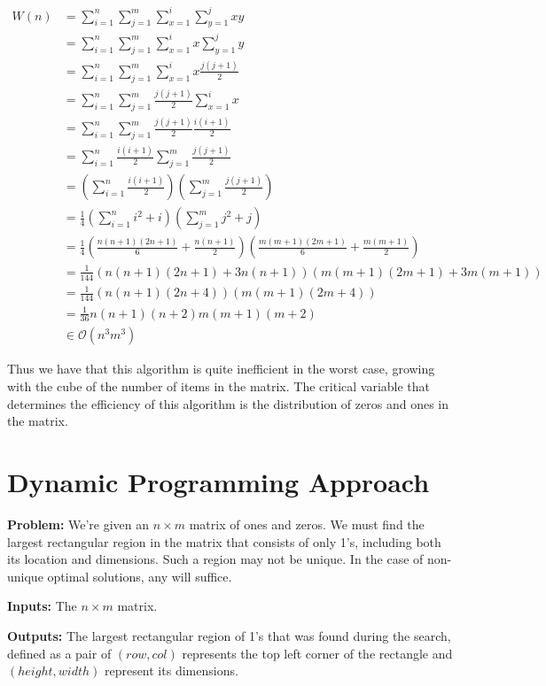 \documentclass{article}
\begin{document}
\begin{align}
W(n) &= \sum_{i=1}^n {\sum_{j=1}^m {\sum_{x=1}^i{\sum_{y=1}^j{xy}}}} \\
&= \sum_{i=1}^n {\sum_{j=1}^m {\sum_{x=1}^i{x \sum_{y=1}^j{y}}}} \\
&= \sum_{i=1}^n {\sum_{j=1}^m {\sum_{x=1}^i{x \frac{j(j+1)}{2}}}} \\
&= \sum_{i=1}^n {\sum_{j=1}^m {\frac{j(j+1)}{2}\sum_{x=1}^i{x}}} \\
&= \sum_{i=1}^n {\sum_{j=1}^m {\frac{j(j+1)}{2}\frac{i(i+1)}{2}}} \\
&= \sum_{i=1}^n {\frac{i(i+1)}{2}\sum_{j=1}^m {\frac{j(j+1)}{2}}} \\
&= \left(\sum_{i=1}^n {\frac{i(i+1)}{2}}\right)\left(\sum_{j=1}^m {\frac{j(j+1)}{2}}\right) \\
&= \frac{1}{4}\left(\sum_{i=1}^n {i^2+i}\right)\left(\sum_{j=1}^m {j^2+j}\right) \\
&= \frac{1}{4}\left( \frac{n(n+1)(2n+1)}{6} + \frac{n(n+1)}{2} \right)\left( \frac{m(m+1)(2m+1)}{6} + \frac{m(m+1)}{2} \right) \\
&= \frac{1}{144}\left( n(n+1)(2n+1) + 3n(n+1) \right)\left( m(m+1)(2m+1) + 3m(m+1) \right) \\
&= \frac{1}{144}\left( n(n+1)(2n+4) \right)\left( m(m+1)(2m+4) \right) \\
&= \frac{1}{36} n(n+1)(n+2)m(m+1)(m+2) \\
&\in \mathcal{O}(n^3m^3)
\end{align}

Thus we have that this algorithm is quite inefficient in the worst case, growing with the cube of the number of items in the matrix.
The critical variable that determines the efficiency of this algorithm is the distribution of zeros and ones in the matrix.

\pagebreak
\section{Dynamic Programming Approach}

\textbf{Problem:}
We're given an $n \times m$ matrix of ones and zeros.
We must find the largest rectangular region in the matrix that consists of only 1's, including both its location and dimensions.
Such a region may not be unique.
In the case of non-unique optimal solutions, any will suffice.

\textbf{Inputs:}
The $n \times m$ matrix.

\textbf{Outputs:}
The largest rectangular region of 1's that was found during the search, defined as a pair of $(row, col)$ represents the top left corner of the rectangle and $(height, width)$ represent its dimensions.
\end{document}
